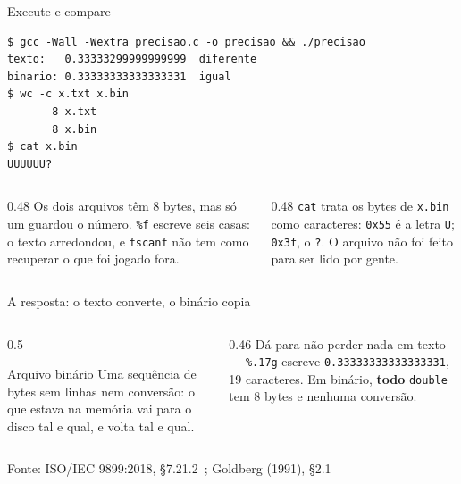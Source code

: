 \documentclass[aspectratio=169]{beamer}
\newcommand{\fileira}[4]{%
  \foreach \c [count=\k from 0] in {#4} {
    \node[#3] at (#1+0.36*\k, #2) {\c};
  }
}
\newcommand{\fileirax}[4]{%
  \foreach \c [count=\k from 0] in {#4} {
    \node[#3, minimum width=0.5cm] at (#1+0.5*\k, #2) {\c};
  }
}
\newcommand{\fonte}[1]{\vfill\hfill{\scriptsize\textcolor{UFSGray}{Fonte: #1}}}
\begin{document}
\begin{frame}[fragile]{Execute e compare}
\begin{lstlisting}[style=shellStyle]
$ gcc -Wall -Wextra precisao.c -o precisao && ./precisao
texto:   0.33333299999999999  diferente
binario: 0.33333333333333331  igual
$ wc -c x.txt x.bin
       8 x.txt
       8 x.bin
$ cat x.bin
UUUUUU?
\end{lstlisting}
  \begin{columns}[T]
    \begin{column}{0.48\textwidth}
      \small Os dois arquivos têm 8 bytes, mas só um guardou o número.
      \texttt{\%f} escreve seis casas: o texto arredondou, e
      \texttt{fscanf} não tem como recuperar o que foi jogado fora.
    \end{column}
    \begin{column}{0.48\textwidth}
      \small \texttt{cat} trata os bytes de \texttt{x.bin} como caracteres:
      \texttt{0x55} é a letra \texttt{U}; \texttt{0x3f}, o \texttt{?}. O arquivo não foi feito para ser
      lido por gente.
    \end{column}
  \end{columns}
\end{frame}

\begin{frame}{A resposta: o texto converte, o binário copia}
  \begin{center}
  \end{center}
  \vspace{-0.3em}
  \begin{columns}[T]
    \begin{column}{0.5\textwidth}
      \begin{block}{Arquivo binário}
        \small Uma sequência de bytes sem linhas nem conversão: o que estava
        na memória vai para o disco tal e qual, e volta tal e qual.
      \end{block}
    \end{column}
    \begin{column}{0.46\textwidth}
      \small Dá para não perder nada em texto --- \texttt{\%.17g} escreve
      \texttt{0.33333333333333331}, 19 caracteres. Em binário,
      \textbf{todo} \texttt{double} tem 8 bytes e nenhuma conversão.
    \end{column}
  \end{columns}
  \fonte{ISO/IEC 9899:2018, §7.21.2~\cite{iso2018c17};
    Goldberg (1991), §2.1~\cite{goldberg1991what}}
\end{frame}
\end{document}
